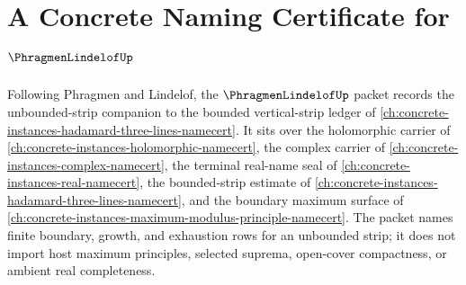 \chapter{A Concrete Naming Certificate for $\PhragmenLindelofUp$}
\label{ch:concrete-instances-phragmen-lindelof-namecert}

Following Phragmen and Lindelof, the $\PhragmenLindelofUp$ packet records the unbounded-strip companion to the bounded vertical-strip ledger of \autoref{ch:concrete-instances-hadamard-three-lines-namecert}. It sits over the holomorphic carrier of \autoref{ch:concrete-instances-holomorphic-namecert}, the complex carrier of \autoref{ch:concrete-instances-complex-namecert}, the terminal real-name seal of \autoref{ch:concrete-instances-real-namecert}, the bounded-strip estimate of \autoref{ch:concrete-instances-hadamard-three-lines-namecert}, and the boundary maximum surface of \autoref{ch:concrete-instances-maximum-modulus-principle-namecert}. The packet names finite boundary, growth, and exhaustion rows for an unbounded strip; it does not import host maximum principles, selected suprema, open-cover compactness, or ambient real completeness.

